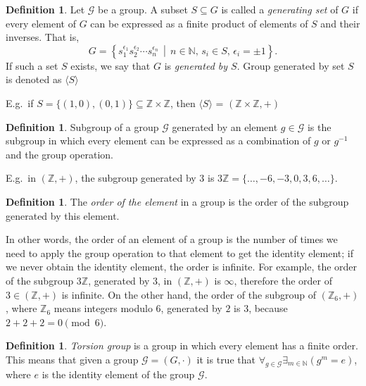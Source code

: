 \documentclass{pracalicmgr2025}
\theoremstyle{plain}            %
\theoremstyle{remark}           %
\theoremstyle{definition}       %
\newtheorem{definition}[theorem]{Definition}
\begin{document}
\begin{definition}
Let $\mathcal{G}$ be a group. A subset $S \subseteq G$ is called a \emph{generating set} of $G$ if every element of $G$ can be expressed as a finite product of elements of $S$ and their inverses. That is,
$$
G = \left\{ s_1^{\epsilon_1} s_2^{\epsilon_2} \cdots s_n^{\epsilon_n} \,\middle|\, n \in \mathbb{N},\, s_i \in S,\, \epsilon_i = \pm 1 \right\}.
$$
If such a set $S$ exists, we say that $G$ is \emph{generated by $S$}. Group generated by set $S$ is denoted as $\langle S \rangle$
\end{definition}
\medskip

\noindent E.g.\ if $S = \{(1,0),(0,1)\} \subseteq \mathbb{Z} \times \mathbb{Z} $, then $\langle S \rangle$ = $(\mathbb{Z} \times \mathbb{Z}, +)$
\begin{definition}
Subgroup of a group $\mathcal{G}$ generated by an element $g \in \mathcal{G}$ is the subgroup in which every element can be expressed as a combination of $g$ or $g^{-1}$ and the group operation.
\end{definition}

\noindent E.g.\ in $(\mathbb{Z},+)$, the subgroup generated by $3$ is $3\mathbb{Z} = \{\dots,-6,-3,0,3,6,\dots\}$.

\begin{definition}
The \textit{order of the element} in a group is the order of the subgroup generated by this element.
\end{definition}
\noindent In other words, the order of an element of a group is the number of times we need to apply the group operation to that element to get the identity element; if we never obtain the identity element, the order is infinite. For example, the order of the subgroup $3\mathbb{Z}$, generated by $3$, in $(\mathbb{Z},+)$ is $\infty$, therefore the order of $3 \in (\mathbb{Z}, +)$ is infinite. On the other hand, the order of the subgroup of $(\mathbb{Z}_6,+)$, where $\mathbb{Z}_6$ means integers modulo $6$, generated by $2$ is $3$, because $2+2+2 = 0 \pmod{6}$.




\begin{definition}
     \textit{Torsion group} is a group in which every element has a finite order. This means that given a group $\mathcal{G} = (G, \cdot)$ it is true  that  $ \forall_{g\in\mathcal{G}}\exists_{m\in\mathbb{N}}(g^m = e)$, where $e$ is the identity element of the group $\mathcal{G}$.
\end{definition}   
\end{document}
